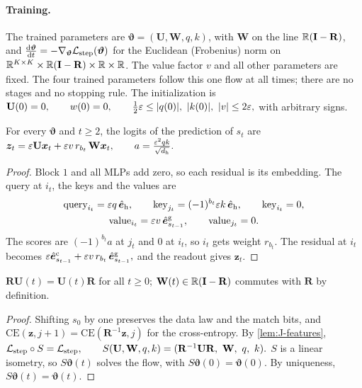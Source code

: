 \paragraph{Training.} The trained parameters are $\bm\vartheta=(\mathbf U,\mathbf W,q,k)$, with $\mathbf W$ on the line $\mathbb R(\mathbf I-\mathbf R)$, and
$\ddt{\bm\vartheta}=-\nabla_{\bm\vartheta}\Lstep(\bm\vartheta)$ for the Euclidean (Frobenius) norm on $\mathbb R^{K\times K}\times\mathbb R(\mathbf I-\mathbf R)\times\mathbb R\times\mathbb R$. The value factor $v$
and all other parameters are fixed. The four trained parameters follow this one flow at all times; there are no stages and no stopping
rule. The initialization is
 $\mathbf U(0)=0,\qquad w(0)=0,\qquad \tfrac{1}{2}\initscale\le|q(0)|,\ |k(0)|,\ |v|\le2\initscale,$ 
with arbitrary signs.

\begin{lemma}
\label{lem:J-features}
For every $\bm\vartheta$ and $t\ge2$, the logits of the prediction of $s_t$ are
 $\bm z_t=\varepsilon \mathbf U\bm x_t+\varepsilon v\,r_{b_t}\,\mathbf W\bm x_t,\qquad a=\frac{\varepsilon^2qk}{\sqrt{d_{\mathrm h}}}.$ 
\end{lemma}

\begin{proof}
Block $1$ and all MLPs add zero, so each residual is its embedding. The query at $i_t$, the keys and the values are
\begin{gather*}
 \text{query}_{i_t}=\varepsilon q\,\hat{\bm e}_{\mathrm h},\qquad \text{key}_{j_t}=(-1)^{b_t}\varepsilon k\,\hat{\bm e}_{\mathrm h},\qquad \text{key}_{i_t}=0,\\
 \text{value}_{i_t}=\varepsilon v\,\hat{\bm e}^{\mathrm g}_{s_{t-1}},\qquad \text{value}_{j_t}=0 .
\end{gather*}
The scores are $(-1)^{b_t}a$ at $j_t$ and $0$ at $i_t$, so $i_t$ gets weight $r_{b_t}$. The residual at $i_t$ becomes
 $\varepsilon\hat{\bm e}^{\mathrm c}_{s_{t-1}}+\varepsilon v\,r_{b_t}\,\hat{\bm e}^{\mathrm g}_{s_{t-1}},$ 
and the readout gives $\bm z_t$.
\end{proof}

\begin{lemma}
\label{lem:J-symmetry}
$\mathbf R\mathbf U(t)=\mathbf U(t)\mathbf R$ for all $t\ge0$; $\mathbf W(t)\in\mathbb R(\mathbf I-\mathbf R)$ commutes with $\mathbf R$ by definition.
\end{lemma}

\begin{proof}
Shifting $s_0$ by one preserves the data law and the match bits, and $\mathrm{CE}(\bm z,j+1)=\mathrm{CE}(\mathbf R^{-1}\bm z,j)$ for the cross-entropy. By \cref{lem:J-features},
 $\mathcal L_{\mathrm{step}}\circ S=\mathcal L_{\mathrm{step}},\qquad S(\mathbf U,\mathbf W,q,k)=(\mathbf R^{-1}\mathbf U\mathbf R,\ \mathbf W,\ q,\ k).$ 
$S$ is a linear isometry, so $S\bm\vartheta(t)$ solves the flow, with $S\bm\vartheta(0)=\bm\vartheta(0)$. By uniqueness, $S\bm\vartheta(t)=\bm\vartheta(t)$.
\end{proof}

